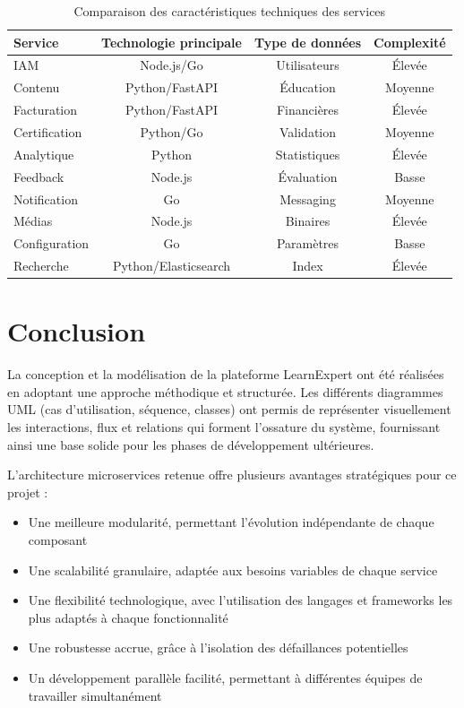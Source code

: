\begin{table}[H]
\centering
\small
\caption{Comparaison des caractéristiques techniques des services}
\label{tab:comparaison_services}
\begin{tabular}{|l|c|c|c|}
\hline
\textbf{Service} & \textbf{Technologie principale} & \textbf{Type de données} & \textbf{Complexité} \\
\hline
IAM & Node.js/Go & Utilisateurs & Élevée \\
Contenu & Python/FastAPI & Éducation & Moyenne \\
Facturation & Python/FastAPI & Financières & Élevée \\
Certification & Python/Go & Validation & Moyenne \\
Analytique & Python & Statistiques & Élevée \\
Feedback & Node.js & Évaluation & Basse \\
Notification & Go & Messaging & Moyenne \\
Médias & Node.js & Binaires & Élevée \\
Configuration & Go & Paramètres & Basse \\
Recherche & Python/Elasticsearch & Index & Élevée \\
\hline
\end{tabular}
\end{table}
\normalsize

\section{Conclusion}

La conception et la modélisation de la plateforme LearnExpert ont été réalisées en adoptant une approche méthodique et structurée. Les différents diagrammes UML (cas d'utilisation, séquence, classes) ont permis de représenter visuellement les interactions, flux et relations qui forment l'ossature du système, fournissant ainsi une base solide pour les phases de développement ultérieures.

L'architecture microservices retenue offre plusieurs avantages stratégiques pour ce projet :
\begin{itemize}
  \item Une meilleure modularité, permettant l'évolution indépendante de chaque composant
  \item Une scalabilité granulaire, adaptée aux besoins variables de chaque service
  \item Une flexibilité technologique, avec l'utilisation des langages et frameworks les plus adaptés à chaque fonctionnalité
  \item Une robustesse accrue, grâce à l'isolation des défaillances potentielles
  \item Un développement parallèle facilité, permettant à différentes équipes de travailler simultanément
\end{itemize}

